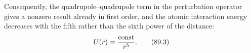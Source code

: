 Consequently, the quadrupole--quadrupole term in the perturbation operator gives a nonzero result already in first order, and the atomic interaction energy decreases with the fifth rather than the sixth power of the distance:
\begin{equation}
U(r)=\frac{\mathop{\rm const}\nolimits}{r^5}.
\tag{89.3}
\end{equation}
